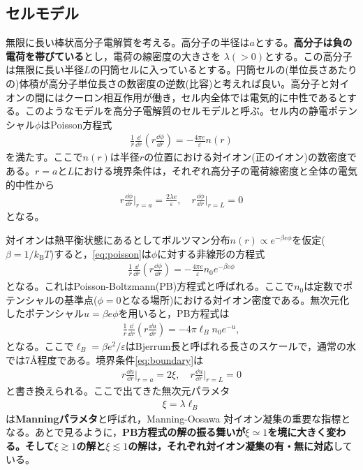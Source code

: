 \documentclass[11pt,a4paper]{ltjsarticle}
\theoremstyle{definition}
\theoremstyle{remark}
\begin{document}
\subsection{セルモデル}
無限に長い棒状高分子電解質を考える。高分子の半径は$a$とする。\textbf{高分子は負の電荷を帯びている}とし，電荷の線密度の大きさを $\lambda(>0)$とする。この高分子は無限に長い半径$L$の円筒セルに入っているとする。円筒セルの(単位長さあたりの)体積が高分子単位長さの数密度の逆数(比容)と考えれば良い。高分子と対イオンの間にはクーロン相互作用が働き，セル内全体では電気的に中性であるとする。このようなモデルを高分子電解質のセルモデルと呼ぶ。セル内の静電ポテンシャル$\phi$はPoisson方程式
\begin{align}
\frac{1}{r}\frac{\dd}{\dd r}\left(r\frac{\dd \phi}{\dd r}\right)=-\frac{4\pi e}{\varepsilon}n(r) \label{eq:poisson}
\end{align}
を満たす。ここで$n(r)$は半径$r$の位置における対イオン(正のイオン)の数密度である。$r=a$と$L$における境界条件は，それぞれ高分子の電荷線密度と全体の電気的中性から
\begin{align}
  r\frac{\dd\phi}{\dd r}\bigg|_{r=a}=\frac{2\lambda e}{\varepsilon}, \quad r\frac{\dd\phi}{\dd r}\bigg|_{r=L}=0 \label{eq:boundary}
\end{align}
となる。



対イオンは熱平衡状態にあるとしてボルツマン分布$n(r)\propto e ^{-\beta e \phi}$を仮定($\beta=1/k_\mathrm{B}T$)すると，\eqref{eq:poisson}は$\phi$に対する非線形の方程式
\begin{align}
\frac{1}{r}\frac{\dd}{\dd r}\left(r\frac{\dd \phi}{\dd r}\right)=-\frac{4\pi e}{\varepsilon}n_0 e^{-\beta e \phi}
\end{align}
となる。これはPoisson-Boltzmann(PB)方程式と呼ばれる。ここで$n_0$は定数でポテンシャルの基準点($\phi=0$となる場所)における対イオン密度である。無次元化したポテンシャル$u=\beta e \phi$を用いると，PB方程式は
\begin{align}
  \frac{1}{r}\frac{\dd}{\dd r}\left(r\frac{\dd u}{\dd r}\right)=-4\pi \ell_Bn_0 e^{-u}, \label{eq:pb}
\end{align}
となる。ここで$\ell_B=\beta e^2/\varepsilon$はBjerrum長と呼ばれる長さのスケールで，通常の水では7\AA 程度である。境界条件\eqref{eq:boundary}は
\begin{align}
  r\frac{\dd u}{\dd r}\bigg|_{r=a}=2\xi, \quad r\frac{\dd u}{\dd r}\bigg|_{r=L}=0 \label{eq:boundary2}
\end{align}
と書き換えられる。ここで出てきた無次元パラメタ
\begin{align}
  \xi=\lambda \ell_B \label{eq:xi}
\end{align}
は\textbf{Manningパラメタ}と呼ばれ\cite{Manning1969_I,Manning1969_II}，Manning-Oosawa 対イオン凝集の重要な指標となる。あとで見るように，\textbf{PB方程式の解の振る舞いが$\xi\simeq 1$を境に大きく変わる。そして$\xi \gtrsim 1$の解と$\xi \lesssim 1$の解は，それぞれ対イオン凝集の有・無に対応}している。
\end{document}
